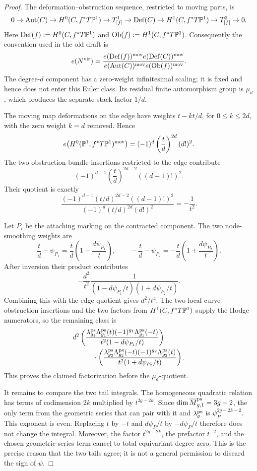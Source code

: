 \documentclass[12pt]{memoir}
\begin{document}
\begin{proof}
The deformation--obstruction sequence, restricted to moving parts, is
\[
 0\to\operatorname{Aut}(C)\to H^0(C,f^*T\mathbb{P}^1)
 \to T^1_{[f]}\to\operatorname{Def}(C)
 \to H^1(C,f^*T\mathbb{P}^1)\to T^2_{[f]}\to0.
\]
Here \(\operatorname{Def}(f):=H^0(C,f^*T\mathbb{P}^1)\) and
\(\operatorname{Ob}(f):=H^1(C,f^*T\mathbb{P}^1)\).
Consequently the convention used in the old draft is
\[
 e(N^{\mathrm{vir}})=
 \frac{e(\operatorname{Def}(f))^{\mathrm{mov}}
 e(\operatorname{Def}(C))^{\mathrm{mov}}}
 {e(\operatorname{Aut}(C))^{\mathrm{mov}}
 e(\operatorname{Ob}(f))^{\mathrm{mov}}}.
\]
The degree-\(d\) component has a zero-weight infinitesimal scaling; it is
fixed and hence does not enter this Euler class.  Its residual finite
automorphism group is \(\mu_d\), which produces the separate stack factor
\(1/d\).

The moving map deformations on the edge have weights
\(t-kt/d\), for \(0\leq k\leq2d\), with the zero weight \(k=d\)
removed.  Hence
\[
 e\bigl(H^0(\mathbb{P}^1,f^*T\mathbb{P}^1)^{\mathrm{mov}}\bigr)
 =(-1)^d\left(\frac td\right)^{2d}(d!)^2.
\]
The two obstruction-bundle insertions restricted to the edge contribute
\[
 (-1)^{d-1}\left(\frac td\right)^{2d-2}((d-1)!)^2.
\]
Their quotient is exactly
\[
 \frac{(-1)^{d-1}(t/d)^{2d-2}((d-1)!)^2}
 {(-1)^d(t/d)^{2d}(d!)^2}=-\frac1{t^2}.
\]

Let \(P_i\) be the attaching marking on the contracted component.  The two
node-smoothing weights are
\[
 \frac td-\psi_{P_1}
 =\frac td\left(1-\frac{d\psi_{P_1}}t\right),\qquad
 -\frac td-\psi_{P_2}
 =-\frac td\left(1+\frac{d\psi_{P_2}}t\right).
\]
After inversion their product contributes
\[
 -\frac{d^2}{t^2}
 \frac1{(1-d\psi_{P_1}/t)(1+d\psi_{P_2}/t)}.
\]
Combining this with the edge quotient gives \(d^2/t^4\).  The two
local-curve obstruction insertions and the two factors from
\(H^1(C,f^*T\mathbb{P}^1)\) supply the Hodge numerators, so the remaining class is
\begin{align*}
 d^2
 &\left(
 \frac{\lambda_{g_1}^{\operatorname{\mathrm{ps}}}\Lambda_{g_1}^{\operatorname{\mathrm{ps}}}(t)(-1)^{g_1}
 \Lambda_{g_1}^{\operatorname{\mathrm{ps}}}(-t)}{t^2(1-d\psi_{P_1}/t)}
 \right)\\
 &\qquad\cdot
 \left(
 \frac{\lambda_{g_2}^{\operatorname{\mathrm{ps}}}\Lambda_{g_2}^{\operatorname{\mathrm{ps}}}(-t)(-1)^{g_2}
 \Lambda_{g_2}^{\operatorname{\mathrm{ps}}}(t)}{t^2(1+d\psi_{P_2}/t)}
 \right).
\end{align*}
This proves the claimed factorization before the \(\mu_d\)-quotient.

It remains to compare the two tail integrals.  The homogeneous quadratic
relation has terms of codimension \(2k\) multiplied by \(t^{2g-2k}\).
Since \(\dim\overline M^{\operatorname{\mathrm{ps}}}_{g,1}=3g-2\), the only term from the geometric
series that can pair with it and \(\lambda_g^{\operatorname{\mathrm{ps}}}\) is
\(\psi_P^{2g-2k-2}\).  This exponent is even.  Replacing \(t\) by
\(-t\) and \(d\psi_P/t\) by \(-d\psi_P/t\) therefore does not change
the integral.  Moreover, the factor \(t^{2g-2k}\), the prefactor
\(t^{-2}\), and the chosen geometric-series term cancel to total
equivariant degree zero.  This is the precise reason that the two tails agree; it is
not a general permission to discard the sign of \(\psi\).
\end{proof}
\end{document}
